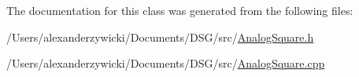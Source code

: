 The documentation for this class was generated from the following files\+:\begin{DoxyCompactItemize}
\item 
/\+Users/alexanderzywicki/\+Documents/\+D\+S\+G/src/\hyperlink{_analog_square_8h}{Analog\+Square.\+h}\item 
/\+Users/alexanderzywicki/\+Documents/\+D\+S\+G/src/\hyperlink{_analog_square_8cpp}{Analog\+Square.\+cpp}\end{DoxyCompactItemize}
